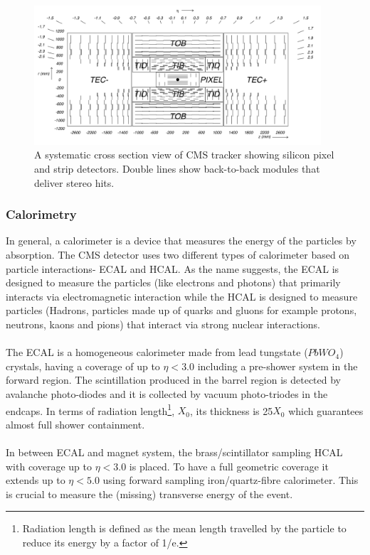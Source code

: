\begin{figure}[!htbp]
	\centering
	\includegraphics[width=0.95\textwidth]{figures/LHC/tracker-cross-section.png}
	\caption{A systematic cross section view of CMS tracker showing silicon pixel and strip detectors. Double lines show back-to-back modules that deliver stereo hits.}
	\label{fig:tracker-cross-section}
\end{figure}


\subsubsection{Calorimetry} %
\label{ssub:calorimetry}
In general, a calorimeter is a device that measures the energy of the particles by absorption. The CMS detector uses two different types of calorimeter based on particle interactions- ECAL and HCAL. As the name suggests, the ECAL is designed to measure the particles (like electrons and photons) that primarily interacts via electromagnetic interaction while the HCAL is designed to measure particles (Hadrons, particles made up of quarks and gluons for example protons, neutrons, kaons and pions) that interact via strong nuclear interactions.\\\\
The ECAL is a homogeneous calorimeter made from lead tungstate ($PbWO_4$) crystals, having a coverage of up to $\eta < 3.0$ including a pre-shower system in the forward region. The scintillation produced in the barrel region is detected by avalanche photo-diodes and it is collected by vacuum photo-triodes in the endcaps. In terms of radiation length\footnote{Radiation length is defined as the mean length travelled by the particle to reduce its energy by a factor of 1/e.}, $X_0$, its thickness is 25$X_0$ which guarantees almost full shower containment.\\\\
In between ECAL and magnet system, the brass/scintillator sampling HCAL with coverage up to $\eta < 3.0$ is placed. To have a full geometric coverage it extends up to $\eta < 5.0$ using forward sampling iron/quartz-fibre calorimeter. This is crucial to measure the (missing) transverse energy of the event.

